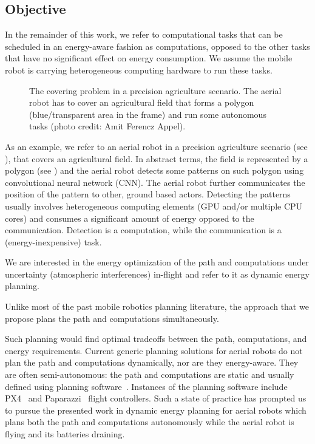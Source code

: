 \subsection{Objective}

In the remainder of this work, we refer to computational tasks that can be scheduled in an energy-aware fashion as computations, opposed to the other tasks that have no significant effect on energy consumption. We assume the mobile robot is carrying heterogeneous computing hardware to run these tasks.

\begin{figure}[t!]
  \centering
  
  \caption[The covering problem in a precision agriculture scenario]{The covering problem in a precision agriculture scenario. The aerial robot has to cover an agricultural field that forms a polygon (blue/transparent area in the frame) and run some autonomous tasks {\scriptsize(photo credit: Amit Ferencz Appel)}.}
  \label{fig:plot2}
\end{figure}

As an example, we refer to an aerial robot in a precision agriculture scenario (see ), that covers an agricultural field. In abstract terms, the field is represented by a polygon (see ) and the aerial robot detects some patterns on such polygon using convolutional neural network (CNN). The aerial robot further communicates the position of the pattern to other, ground based actors. Detecting the patterns usually involves heterogeneous computing elements (GPU and/or multiple CPU cores) and consumes a significant amount of energy opposed to the communication. Detection is a computation, while the communication is a (energy-inexpensive) task.

We are interested in the energy optimization of the path and computations under uncertainty (atmospheric interferences) in-flight and refer to it as dynamic energy planning.

Unlike most of the past mobile robotics planning literature, the approach that we propose plans the path and computations simultaneously. 

Such planning would find optimal tradeoffs between the path, computations, and energy requirements. Current generic planning solutions for aerial robots do not plan the path and computations dynamically, nor are they energy-aware. They are often semi-autonomous: the path and computations are static and usually defined using planning software~\citep{daponte2019review}. Instances of the planning software include PX4~\citep{px4} and Paparazzi~\citep{papa} flight controllers. Such a state of practice has prompted us to pursue the presented work in dynamic energy planning for aerial robots which plans both the path and computations autonomously while the aerial robot is flying and its batteries draining. 

